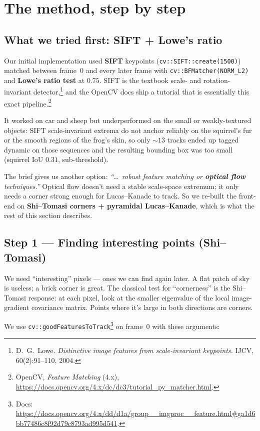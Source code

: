 \documentclass[11pt,a4paper]{article}
\begin{document}
\section{The method, step by step}

\subsection{What we tried first: SIFT + Lowe's ratio}

Our initial implementation used \textbf{SIFT} keypoints
(\texttt{cv::SIFT::create(1500)}) matched between frame~0 and every
later frame with \texttt{cv::BFMatcher(NORM\_L2)} and \textbf{Lowe's
ratio test} at $0.75$. SIFT is the textbook scale- and
rotation-invariant detector,\footnote{D.~G.~Lowe.
\emph{Distinctive image features from scale-invariant keypoints.}
IJCV, 60(2):91--110, 2004.} and the OpenCV docs ship a tutorial that
is essentially this exact pipeline.\footnote{OpenCV,
\emph{Feature Matching} (4.x),
\url{https://docs.opencv.org/4.x/dc/dc3/tutorial_py_matcher.html}.}

It worked on car and sheep but underperformed on the small or
weakly-textured objects: SIFT scale-invariant extrema do not anchor
reliably on the squirrel's fur or the smooth regions of the frog's
skin, so only $\sim\!13$ tracks ended up tagged dynamic on those
sequences and the resulting bounding box was too small (squirrel
IoU $0.31$, sub-threshold).

The brief gives us another option: \emph{``\dots\ robust feature
matching or \textbf{optical flow} techniques.''} Optical flow
doesn't need a stable scale-space extremum; it only needs a corner
strong enough for Lucas--Kanade to track. So we re-built the
front-end on \textbf{Shi--Tomasi corners + pyramidal Lucas--Kanade},
which is what the rest of this section describes.

\subsection{Step 1 --- Finding interesting points (Shi--Tomasi)}

We need ``interesting'' pixels --- ones we can find again later. A
flat patch of sky is useless; a brick corner is great. The classical
test for ``cornerness'' is the Shi--Tomasi response: at each pixel,
look at the smaller eigenvalue of the local image-gradient covariance
matrix. Points where it's large in both directions are corners.

We use \texttt{cv::goodFeaturesToTrack}\footnote{Docs:
\url{https://docs.opencv.org/4.x/dd/d1a/group__imgproc__feature.html\#ga1d6bb77486c8f92d79c8793ad995d541}.}
on frame~0 with these arguments:
\end{document}
